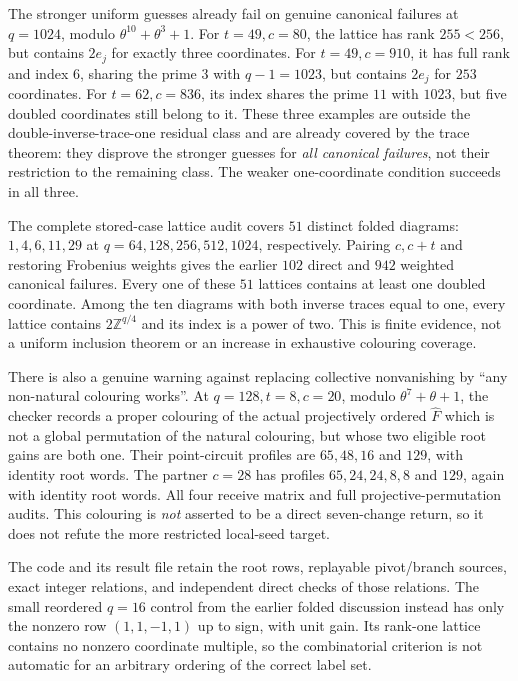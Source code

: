 \documentclass[11pt,a4paper]{article}
\theoremstyle{definition}
\theoremstyle{remark}
\newcommand{\ZZ}{\mathbb{Z}}
\begin{document}
The stronger uniform guesses already fail on genuine canonical failures at $q=1024$, modulo $\theta^{10}+\theta^3+1$.  For $t=49,c=80$, the lattice has rank $255<256$, but contains $2e_j$ for exactly three coordinates.  For $t=49,c=910$, it has full rank and index $6$, sharing the prime $3$ with $q-1=1023$, but contains $2e_j$ for $253$ coordinates.  For $t=62,c=836$, its index shares the prime $11$ with $1023$, but five doubled coordinates still belong to it.  These three examples are outside the double-inverse-trace-one residual class and are already covered by the trace theorem: they disprove the stronger guesses for \emph{all canonical failures}, not their restriction to the remaining class.  The weaker one-coordinate condition succeeds in all three.

The complete stored-case lattice audit covers $51$ distinct folded diagrams: $1,4,6,11,29$ at $q=64,128,256,512,1024$, respectively.  Pairing $c,c+t$ and restoring Frobenius weights gives the earlier $102$ direct and $942$ weighted canonical failures.  Every one of these $51$ lattices contains at least one doubled coordinate.  Among the ten diagrams with both inverse traces equal to one, every lattice contains $2\ZZ^{q/4}$ and its index is a power of two.  This is finite evidence, not a uniform inclusion theorem or an increase in exhaustive colouring coverage.

There is also a genuine warning against replacing collective nonvanishing by ``any non-natural colouring works''.  At $q=128,t=8,c=20$, modulo $\theta^7+\theta+1$, the checker records a proper colouring of the actual projectively ordered $\widehat F$ which is not a global permutation of the natural colouring, but whose two eligible root gains are both one.  Their point-circuit profiles are $65,48,16$ and $129$, with identity root words.  The partner $c=28$ has profiles $65,24,24,8,8$ and $129$, again with identity root words.  All four receive matrix and full projective-permutation audits.  This colouring is \emph{not} asserted to be a direct seven-change return, so it does not refute the more restricted local-seed target.

The code  and its result file retain the root rows, replayable pivot/branch sources, exact integer relations, and independent direct checks of those relations.  The small reordered $q=16$ control from the earlier folded discussion instead has only the nonzero row $(1,1,-1,1)$ up to sign, with unit gain.  Its rank-one lattice contains no nonzero coordinate multiple, so the combinatorial criterion is not automatic for an arbitrary ordering of the correct label set.
\end{document}

